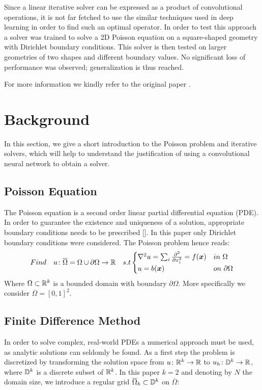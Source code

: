 \documentclass{rescience} %
\begin{document}
Since a linear iterative solver can be expressed as a product of convolutional operations, it is not far fetched to use the similar techniques used in deep learning in order to find such an optimal operator.
In order to test this approach a solver was trained to solve a 2D Poisson equation on a square-shaped geometry with Dirichlet boundary conditions. This solver is then tested on larger geometries of two shapes and different boundary values. No significant loss of performance was observed; generalization is thus reached.

For more information we kindly refer to the original paper \cite{original_paper}.

\section{Background}

In this section, we give a short introduction to the Poisson problem and iterative solvers, which will help to understand the justification of using a convolutional neural network to obtain a solver.

\subsection{Poisson Equation}

The Poisson equation is a second order linear partial differential equation (PDE). In order to guarantee the existence and uniqueness of a solution, appropriate boundary conditions needs to be prescribed [\cite{elliptic}]. In this paper only Dirichlet boundary conditions were considered.
The Poisson problem hence reads:
\begin{equation}
Find \quad u \colon \overline{\Omega}=\Omega\cup\partial\Omega \to {\mathbb{R}} \quad s.t
\begin{cases}
\nabla^2 u = \sum_{i}\frac{\partial^2}{\partial x_i^2} = f({\bm{x}}) & in \ \Omega\\
u = b({\bm{x}}) & on \ \partial \Omega\\
\end{cases}
\label{poisson_def}
\end{equation}
Where $\Omega \subset {\mathbb{R}}^k$ is a bounded domain with boundary $\partial\Omega$. More specifically we consider $\overline{\Omega} = [0,1]^2$.

\subsection{Finite Difference Method}
In order to solve complex, real-world PDEs a numerical approach must be used, as analytic solutions can seldomly be found. As a first step the problem is discretized by transforming the solution space from $u\colon{\mathbb{R}}^k \to {\mathbb{R}}$ to $u_h\colon{\mathbb{D}}^k \to {\mathbb{R}}$, where ${\mathbb{D}}^k$ is a discrete subset of ${\mathbb{R}}^k$. In this paper $k = 2$ and denoting by $N$ the domain size, we introduce a regular grid $\overline{\Omega}_h \subset {\mathbb{D}}^k$ on  $\overline{\Omega}$: 
\end{document}
